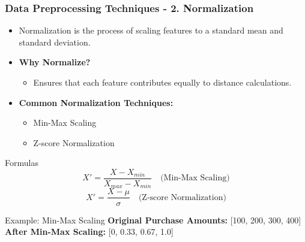\documentclass[aspectratio=169]{beamer}
\begin{document}
\begin{frame}[fragile]
    \frametitle{Data Preprocessing Techniques - 2. Normalization}
    \begin{itemize}
        \item Normalization is the process of scaling features to a standard mean and standard deviation.
        \item \textbf{Why Normalize?}
            \begin{itemize}
                \item Ensures that each feature contributes equally to distance calculations.
            \end{itemize}
        \item \textbf{Common Normalization Techniques:}
            \begin{itemize}
                \item Min-Max Scaling
                \item Z-score Normalization
            \end{itemize}
    \end{itemize}
    \begin{block}{Formulas}
        \begin{equation}
            X' = \frac{X - X_{min}}{X_{max} - X_{min}} \quad \text{(Min-Max Scaling)}
        \end{equation}
        \begin{equation}
            X' = \frac{X - \mu}{\sigma} \quad \text{(Z-score Normalization)}
        \end{equation}
    \end{block}
    \begin{block}{Example: Min-Max Scaling}
        \textbf{Original Purchase Amounts:} [100, 200, 300, 400]
        \newline
        \textbf{After Min-Max Scaling:} [0, 0.33, 0.67, 1.0]
    \end{block}
\end{frame}
\end{document}
